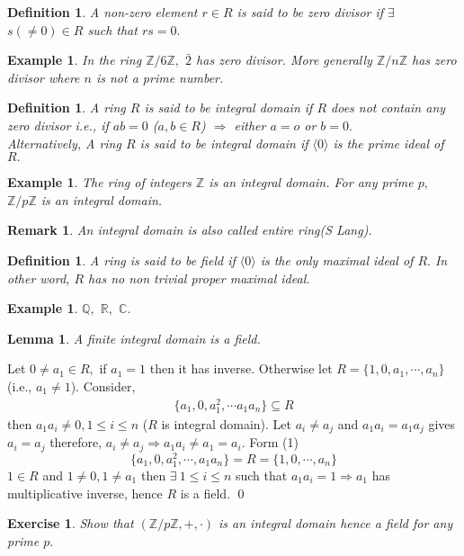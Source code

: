 \documentclass[11pt]{amsart}
\newtheorem{definition}[theorem]{Definition}%
\newtheorem{ex}[theorem]{Exercise}
\newtheorem{example}[theorem]{Example}%
\newtheorem*{remark*}{Remark}
\newtheorem{lemma}[theorem]{Lemma}%
\newcommand{\QQ}{\mathbb Q}
\newcommand{\ZZ}{\mathbb Z}
\newcommand{\CC}{\mathbb C}
\newcommand{\RR}{\mathbb R}
\newcommand{\gen}[1]{\langle#1\rangle}
\begin{document}
\begin{definition}
A non-zero element $r \in R$ is said to be zero divisor if $\exists$ $s(\neq 0) \in R$ such that $rs=0.$
\end{definition}
\begin{example}
In the ring ${\ZZ}/6{\ZZ},$ $\bar{2}$ has zero divisor. More generally ${\ZZ}/n{\ZZ}$ has zero divisor where $n$ is not a prime number.
\end{example}
\begin{definition}
A ring $R$ is said to be integral domain if $R$ does not contain any zero divisor i.e., if $ab=0$ ($a,b \in R$) $\Rightarrow$ either $a=o$ or $b=0.$ \\
Alternatively, A ring $R$ is said to be integral domain if $\gen{0}$ is the prime ideal of $R.$
\end{definition}
\begin{example}
The ring of integers ${\ZZ}$ is an integral domain. For any prime $p,$ ${\ZZ}/p{\ZZ}$ is an integral domain.
\end{example}
\begin{remark*}
An integral domain is also called entire ring(S Lang).
\end{remark*}
\begin{definition}
A ring is said to be field if $\gen{0}$ is the only maximal ideal of $R.$ In other word, $R$ has no non trivial proper maximal ideal.
\end{definition}
\begin{example}
${\QQ},$ ${\RR},$ ${\CC}$.
\end{example}
\begin{lemma}
A finite integral domain is a field.
\end{lemma}
\proof Let $0\neq a_1\in R,$ if $a_1=1$ then it has inverse. Otherwise let $R=\{1,0,a_1,\cdots ,a_n\}$ (i.e., $a_1\neq 1$). Consider, 
\begin{align}
\{a_1,0,a_1^2,\cdots a_1a_n\}\subseteq R
\end{align}
then $a_1a_i\neq 0,1\leq i\leq n$ ($R$ is integral domain). Let $a_i\neq a_j$ and $a_1a_i=a_1a_j$ gives $a_i=a_j$ therefore, $a_i\neq a_j \Rightarrow a_1a_i\neq a_1=a_i.$ Form (1) $$\{a_1,0,a_1^2,\cdots ,a_1a_n\}=R=\{1,0,\cdots ,a_n\}$$ $1\in R$ and $1\neq 0,1\neq a_1$ then $\exists~1\leq i\leq n$ such that $a_1a_i=1 \Rightarrow a_1$ has multiplicative inverse, hence $R$ is a field. \qed
\begin{ex}
Show that $({\ZZ}/p{\ZZ},+,\cdot)$ is an integral domain hence a field for any prime $p.$ 
\end{ex}
\end{document}
